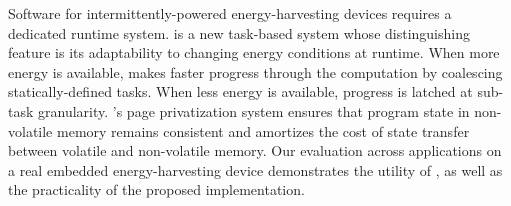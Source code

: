 Software for intermittently-powered energy-harvesting devices requires a dedicated runtime system. \sys is a new task-based system whose distinguishing feature is its adaptability to changing energy conditions at runtime. When more energy is available, \sys makes faster progress through the computation by coalescing statically-defined tasks. When less energy is available, progress is latched at sub-task granularity. \sys's page privatization system ensures that program state in non-volatile memory remains consistent and amortizes the cost of state transfer between volatile and non-volatile memory. Our evaluation across applications on a real embedded energy-harvesting device demonstrates the utility of \sys, as well as the practicality of the proposed implementation.